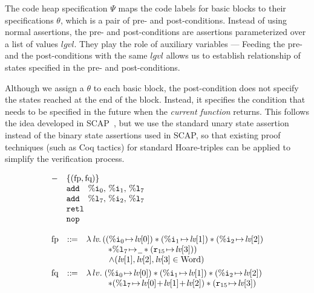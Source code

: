 The code heap specification $\Psi$ maps the code labels
for basic blocks to their specifications $\theta$,
which is a pair of pre- and post-conditions.
Instead of using normal assertions, the pre- and
post-conditions are assertions parameterized over
a list of values $lgvl$. They play the role
of auxiliary variables --- Feeding the pre-
and the post-conditions with the same $lgvl$ allows
us to establish relationship of states specified
in the pre- and post-conditions.

Although we assign a $\theta$ to each basic block,
the post-condition does not specify the states reached at the end
of the block. Instead, it specifies the condition
that needs to be specified in the future when the
{\em current function} returns. This follows the idea
developed in SCAP~\cite{Feng06pldi}, but we use the
standard unary state assertion instead of the binary
state assertions used in SCAP, so that existing
proof techniques (such as Coq tactics) for standard
Hoare-triples can be applied to simplify the verification
process.

\begin{center}
	\vspace*{-2em}
	$$
	\begin{array}{l}
		\begin{array}{ll}
			- & \{(\text{fp}, \text{fq})\} \\
			& \cadd \quad \ireg{0}, \, \ireg{1}, \, \lreg{7} \\
			& \cadd \quad \lreg{7}, \, \ireg{2}, \, \lreg{7} \\
			& \retl \\
			& \nop
		\end{array} \\
		\\
		\begin{array}{lcl}
			\text{fp} & \define &
			\lambda \, \lv.\, 
			((\regst{\ireg{0}}{\lv[0]})
			* (\regst{\ireg{1}}{\lv[1]})
			* (\regst{\ireg{2}}{\lv[2]}) \\
			& &
			\hspace*{6ex} * \regst{\lreg{7}}{\notCare}
						  * (\regst{\reg{15}}{\lv[3]})) 
			\\
			& & 
			\qquad \ \ 
			\land
			(\lv[1], \lv[2], \lv[3] \in \TYPE{Word}) \\
			
			\\[-8pt]
			
			\text{fq} & \define & \lambda \, lv. \;
			(\regst{\ireg{0}}{\lv[0]})
			* (\regst{\ireg{1}}{\lv[1]})
			* (\regst{\ireg{2}}{\lv[2]}) \\
			& &
			\hspace*{6ex}
			* (\regst{\lreg{7}}{\lv[0] \!+\! \lv[1] \!+\! \lv[2]})
						  * (\regst{\reg{15}}{\lv[3]})
		\end{array}
	\end{array}
	$$
	\vspace*{-0.5em}
	\label{fig:functionSpec}
\end{center}

